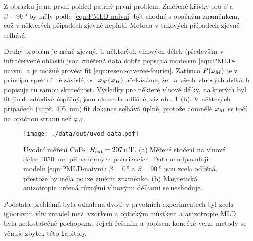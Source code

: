 Z obrázku je na první pohled patrný první problém.
Změřené křivky pro $\beta$ a $\beta+\SI{90}{\degree}$ by měly podle \eqref{eqn:PMLD-naivni} být shodné s opačným znaménkem, což v některých případech zjevně neplatí.
Metoda v takových případech zjevně selhává.

Druhý problém je méně zjevný.
U některých vlnových délek (především v infračervené oblasti) jsou změřená data dobře popsaná modelem \eqref{eqn:PMLD-naivni} a je možné provést fit \eqref{eqn:reseni-ctverce-fourier}.
Zatímco $P(\varphi_M)$ je v principu spektrálně závislé, od $\varphi_M(\varphi_H)$ očekáváme, že na všech vlnových délkách popisuje tu samou skutečnost.
Výsledky pro některé vlnové délky, na kterých byl fit jinak zdánlivě úspěšný, jsou ale zcela odlišné, viz obr. \ref{fig:g-uvod-data} (b).
V některých případech (např. \SI{405}{\nano\meter}) fit dokonce selhává úplně, protože domnělé $\varphi_M$ se točí na opačnou stranu než $\varphi_H$.

\begin{figure}[htbp]
    \centering
    \texttt{[image: ./data/out/uvod-data.pdf]}
    \caption{Úvodní měření CoFe, $H_\textrm{ext}=\SI{207}{\milli\tesla}$. (a) Měřené stočení na vlnové délce \SI{1050}{\nano\meter} při vybraných polarizacích. Data neodpovídají modelu \eqref{eqn:PMLD-naivni}: $\beta=\SI{0}{\degree}$ a $\beta=\SI{90}{\degree}$ jsou zcela odlišná, přestože by měla pouze změnit znaménko. (b) Magnetická anizotropie určená různými vlnovými délkami se neshoduje.}
    \label{fig:g-uvod-data}
\end{figure}

Podstata problémů byla odhalena dvojí: v prvotních experimentech byl zcela ignorován vliv zrcadel mezi vzorkem a optickým můstkem a anizotropie MLD byla nedostatečně pochopena.
Jejich řešením a popisem konečné verze metody se věnuje zbytek této kapitoly.
